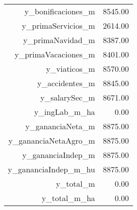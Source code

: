 \begin{table}[ht]
\begin{tabular}{rr}
  y\_bonificaciones\_m & 8545.00 \\ 
  y\_primaServicios\_m & 2614.00 \\ 
  y\_primaNavidad\_m & 8387.00 \\ 
  y\_primaVacaciones\_m & 8401.00 \\ 
  y\_viaticos\_m & 8570.00 \\ 
  y\_accidentes\_m & 8845.00 \\ 
  y\_salarySec\_m & 8671.00 \\ 
  y\_ingLab\_m\_ha & 0.00 \\ 
  y\_gananciaNeta\_m & 8875.00 \\ 
  y\_gananciaNetaAgro\_m & 8875.00 \\ 
  y\_gananciaIndep\_m & 8875.00 \\ 
  y\_gananciaIndep\_m\_hu & 8875.00 \\ 
  y\_total\_m & 0.00 \\ 
  y\_total\_m\_ha & 0.00 \\ 
   \hline
\end{tabular}
\end{table}
